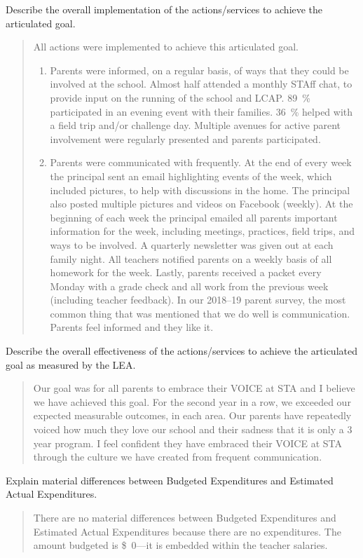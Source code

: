 \documentclass{article}
\newcommand{\dollar}[1]{\SI{#1}[\$]{}}
\newcounter{goal}[section] %
\newcounter{action}[goal]
\newenvironment{actionanalysis}
	{
		\begin{enumerate}[label={\bf Action \theenumi:}]
	}
	{
		\end{enumerate}
	}
\begin{document}
Describe the overall implementation of the actions/services to achieve the articulated goal.
\begin{quotation}
	All actions were implemented to achieve this articulated goal.
	\begin{actionanalysis}
	\item Parents were informed, on a regular basis, of ways that they could be involved at the school. Almost half attended a monthly STAff chat, to provide input on the running of the school and LCAP. \SI{89}{\percent} participated in an evening event with their families. \SI{36}{\percent} helped with a field trip and/or challenge day. Multiple avenues for active parent involvement were regularly presented and parents participated.
	\item Parents were communicated with frequently. At the end of every week the principal sent an email highlighting events of the week, which included pictures, to help with discussions in the home. The principal also posted multiple pictures and videos on Facebook (weekly). At the beginning of each week the principal emailed all parents important information for the week, including meetings, practices, field trips, and ways to be involved. A quarterly newsletter was given out at each family night. All teachers notified parents on a weekly basis of all homework for the week. Lastly, parents received a packet every Monday with a grade check and all work from the previous week (including teacher feedback). In our 2018--19 parent survey, the most common thing that was mentioned that we do well is communication. Parents feel informed and they like it.
	\end{actionanalysis}
\end{quotation}

Describe the overall effectiveness of the actions/services to achieve the articulated goal as measured by the LEA.
\begin{quotation}
	Our goal was for all parents to embrace their VOICE at STA and I believe we have achieved this goal. For the second year in a row, we exceeded our expected measurable outcomes, in each area. Our parents have repeatedly voiced how much they love our school and their sadness that it is only a 3 year program. I feel confident they have embraced their VOICE at STA through the culture we have created from frequent communication.
\end{quotation}

Explain material differences between Budgeted Expenditures and Estimated Actual Expenditures.
\begin{quotation}
	There are no material differences between Budgeted Expenditures and Estimated Actual Expenditures because there are no expenditures. The amount budgeted is \dollar{0}---it is embedded within the teacher salaries.
\end{quotation}
\end{document}
